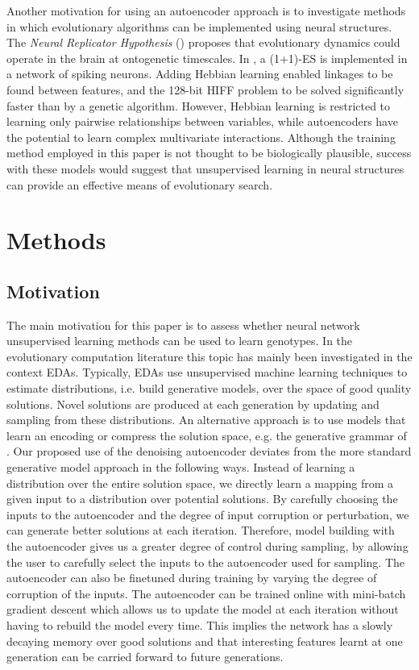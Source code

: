 \documentclass[twoside]{article}
\begin{document}
Another motivation for using an autoencoder approach is to investigate methods in which evolutionary algorithms can be implemented using neural structures. The {\em{Neural Replicator Hypothesis}} (\cite{fernando2010neuronal}) proposes that evolutionary dynamics could operate in the brain at ontogenetic timescales. In \cite{fernando2010neuronal}, a (1+1)-ES is implemented in a network of spiking neurons. Adding Hebbian learning enabled linkages to be found between features, and the 128-bit HIFF problem to be solved significantly faster than by a genetic algorithm. However, Hebbian learning is restricted to learning only pairwise relationships between variables, while autoencoders have the potential to learn complex multivariate interactions. Although the training method employed in this paper is not thought to be biologically plausible, success with these models would suggest that unsupervised learning in neural structures can provide an effective means of evolutionary search.

\section{Methods}

\subsection{Motivation}

The main motivation for this paper is to assess whether neural network unsupervised learning methods can be used to learn genotypes. In the evolutionary computation literature this topic has mainly been investigated in the context EDAs. Typically, EDAs use unsupervised machine learning techniques to estimate distributions, i.e. build generative models, over the space of good quality solutions. Novel solutions are produced at each generation by updating and sampling from these distributions. An alternative approach is to use models that learn an encoding or compress the solution space, e.g. the generative grammar of \cite{cox2014solving}. Our proposed use of the denoising autoencoder deviates from the more standard generative model approach in the following ways. Instead of learning a distribution over the entire solution space, we directly learn a mapping from a given input to a distribution over potential solutions. By carefully choosing the inputs to the autoencoder and the degree of input corruption or perturbation, we can generate better solutions at each iteration. Therefore, model building with the autoencoder gives us a greater degree of control during sampling, by allowing the user to carefully select the inputs to the autoencoder used for sampling. The autoencoder can also be finetuned during training by varying the degree of corruption of the inputs. The autoencoder can be trained online with mini-batch gradient descent which allows us to update the model at each iteration without having to rebuild the model every time. This implies the network has a slowly decaying memory over good solutions and that interesting features learnt at one generation can be carried forward to future generations.
\end{document}

